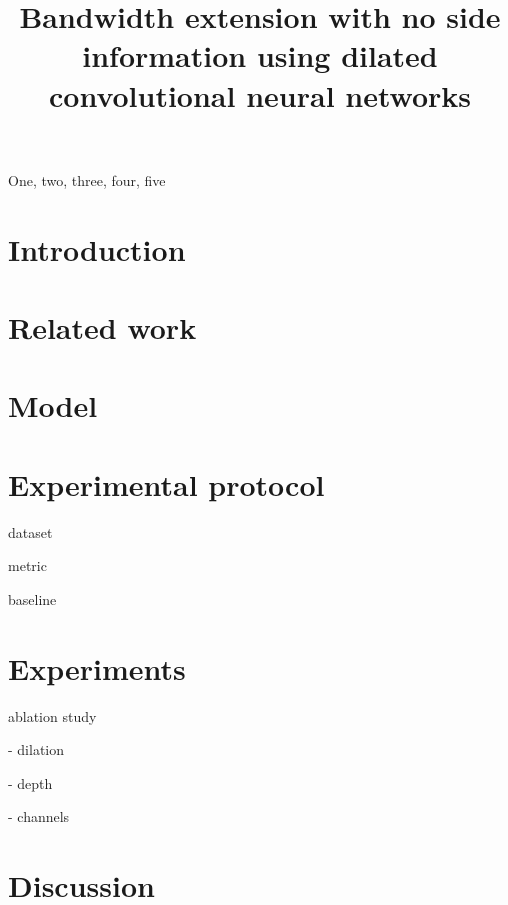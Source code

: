 \documentclass{article}
\title{Bandwidth extension with no side information using dilated convolutional neural networks}
\begin{document}
%
\maketitle
%
\begin{abstract}

\end{abstract}
%
\begin{keywords}
One, two, three, four, five
\end{keywords}
%
\section{Introduction}
\label{sec:intro}

\section{Related work}
\label{sec:soa}

\cite{dietz2002spectral, ehret2004audio, ekstrand2002bandwidth, friedrich2007spectral, nagel2009harmonic}

\section{Model}
\label{sec:model}

\section{Experimental protocol}
\label{sec:protocol}

dataset

metric

baseline


\section{Experiments}
\label{sec:experiments}

ablation study

- dilation

- depth

- channels


\section{Discussion}
\label{sec:discussion}

\vfill\pagebreak




\end{document}
